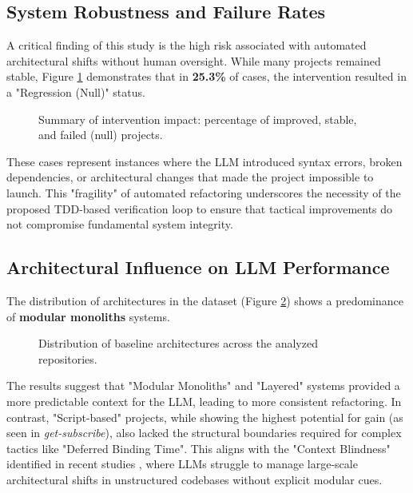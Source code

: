 \documentclass[sigconf,review]{acmart}
\begin{document}
\subsection{System Robustness and Failure Rates}
A critical finding of this study is the high risk associated with automated architectural shifts without human oversight. While many projects remained stable, Figure \ref{fig:impact_pie} demonstrates that in \textbf{25.3\%} of cases, the intervention resulted in a "Regression (Null)" status. 

\begin{figure}[htbp]
    \centering
    \resizebox{0.5\textwidth}{!}{}
    \caption{Summary of intervention impact: percentage of improved, stable, and failed (null) projects.}
    \label{fig:impact_pie}
\end{figure}

These cases represent instances where the LLM introduced syntax errors, broken dependencies, or architectural changes that made the project impossible to launch. This "fragility" of automated refactoring underscores the necessity of the proposed TDD-based verification loop to ensure that tactical improvements do not compromise fundamental system integrity.

\subsection{Architectural Influence on LLM Performance}
The distribution of architectures in the dataset (Figure \ref{fig:arch_dist}) shows a predominance of \textbf{modular monoliths} systems. 

\begin{figure}[htbp]
    \centering
    \resizebox{0.5\textwidth}{!}{}
    \caption{Distribution of baseline architectures across the analyzed repositories.}
    \label{fig:arch_dist}
\end{figure}

The results suggest that "Modular Monoliths" and "Layered" systems provided a more predictable context for the LLM, leading to more consistent refactoring. In contrast, "Script-based" projects, while showing the highest potential for gain (as seen in \textit{get-subscribe}), also lacked the structural boundaries required for complex tactics like "Deferred Binding Time". This aligns with the "Context Blindness" identified in recent studies \cite{horikawa2025agentic}, where LLMs struggle to manage large-scale architectural shifts in unstructured codebases without explicit modular cues.
\end{document}
